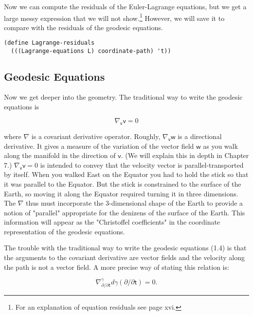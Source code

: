 \documentclass[11pt]{article}
\begin{document}
Now we can compute the residuals of the Euler-Lagrange equations, but we get
a large messy expression that we will not show.\footnote{For an explanation of equation residuals see page xvi.} However, we will save it to
compare with the residuals of the geodesic equations.

\begin{verbatim}
(define Lagrange-residuals
  (((Lagrange-equations L) coordinate-path) 't))
\end{verbatim}

\subsection{Geodesic Equations}
\label{sec:org4dc62df}

Now we get deeper into the geometry. The traditional way to write the
geodesic equations is

\begin{equation}
\nabla_{\mathsf{v}} \mathsf{v}=0
\end{equation}

where \(\nabla\) is a covariant derivative operator. Roughly,
\(\nabla_{\mathsf{v}} \mathsf{w}\) is a directional derivative. It gives a
measure of the variation of the vector field \(\mathsf{w}\) as you walk along
the manifold in the direction of \(\mathsf{v}\). (We will explain this in depth
in Chapter 7.) \(\nabla_{\mathsf{v}} \mathsf{v}=0\) is intended to convey that
the velocity vector is parallel-transported by itself. When you walked East
on the Equator you had to hold the stick so that it was parallel to the
Equator. But the stick is constrained to the surface of the Earth, so moving
it along the Equator required turning it in three dimensions. The \(\nabla\)
thus must incorporate the 3-dimensional shape of the Earth to provide a
notion of "parallel" appropriate for the denizens of the surface of the
Earth. This information will appear as the "Christoffel coefficients" in the
coordinate representation of the geodesic equations.

The trouble with the traditional way to write the geodesic equations (1.4) is
that the arguments to the covariant derivative are vector fields and the
velocity along the path is not a vector field. A more precise way of stating
this relation is:

\begin{equation}
\nabla^\gamma_{\partial/\partial\mathsf{t}} d\gamma\left(\partial/\partial \mathsf{t}\right) = 0.
\end{equation}
\end{document}
